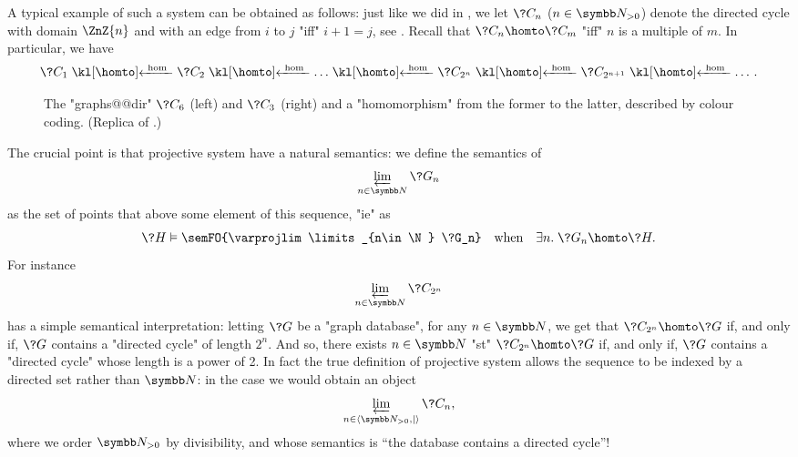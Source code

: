 A typical example of such a system can be obtained as follows:
just like we did in ,
we let $\?C_n$ ($n\in\Np$) denote the directed cycle with domain $\ZnZ{n}$
and with an edge from $i$ to $j$ "iff" $i+1 = j$, see .
Recall that $\?C_n \homto \?C_m$ "iff" $n$ is a multiple of $m$.
In particular, we have
\[
	\?C_1 \cohomto \?C_2 \cohomto \dotsc \cohomto \?C_{2^n} \cohomto \?C_{2^{n+1}} \cohomto \dotsc.
\]
\begin{figure}
	\centering
	\caption{\AP\label{fig:conclu-db-cycles} The "graphs@@dir" $\?C_6$
	(left) and $\?C_3$ (right) and a "homomorphism" from the former
	to the latter, described by colour coding. (Replica of .)}
\end{figure}

The crucial point is that projective system have a natural semantics:
we define the semantics of \[\varprojlim\limits_{n\in\N} \?G_n\]
as the set of points that above some element of this sequence,
"ie" as
\[
	\?H \vDash \semFO{\varprojlim\limits_{n\in\N} \?G_n}
	\quad\text{when}\quad
	\exists n.\; \?G_n \homto \?H.
\]
For instance
\[\varprojlim\limits_{n\in\N} \?C_{2^n}\] has a simple
semantical interpretation:
letting $\?G$ be a "graph database", for any $n\in\N$, we get that $\?C_{2^n} \homto \?G$
if, and only if, $\?G$ contains a "directed cycle" of length $2^n$.
And so, there exists $n\in\N$ "st" $\?C_{2^n} \homto \?G$ if, and only if, $\?G$ contains
a "directed cycle" whose length is a power of 2.
In fact the true definition of projective system allows the sequence to
be indexed by a directed set rather than $\N$: in the case we would obtain
an object \[\varprojlim\limits_{n\in\tup{\Np,\mid}} \?C_{n},\] where we order $\Np$ by divisibility,
and whose semantics is ``the database contains a directed cycle''!

